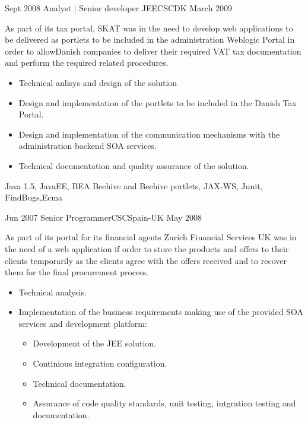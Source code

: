 \begin{experiences}
  \emptySeparator

  \experience
    {Sept 2008}     {Analyst | Senior developer JEE}{CSC}{DK}
    {March 2009}    {
    
As part of its tax portal, SKAT was in the need to develop web applications to be delivered as
portlets to be included in the administration Weblogic Portal in order to allowDanish
companies to deliver their required VAT tax documentation and perform the required related
procedures.    
    
                      \begin{itemize}
                        \item Technical anlisys and design of the solution	
                        \item Design and implementation of the portlets to be included in the Danish Tax Portal.	                
                        \item Design and implementation of the communication mechanisms with the administration backend SOA services.
                        \item Technical documentation and quality assurance of the solution.
                      \end{itemize}
                    }
                    {Java 1.5, JavaEE, BEA Beehive and Beehive portlets, JAX-WS, Junit, FindBugs,Ecma}
  
  
  
  \emptySeparator
  
  
  
  \experience
  {Jun 2007}       {Senior Programmer}{CSC}{Spain-UK}
  {May 2008}   {
  
  As part of its portal for its financial agents Zurich Financial Services UK was in the need of a web application if order to store the products and offers to their clients temporarily as the clients agree with the offers received and to recover them for the final procurement process.
  
                      \begin{itemize}
                        
                        \item Technical analysis. 

                        \item Implementation of the business requirements making use of the provided SOA services and development platform:
                        \begin{itemize}
                          \item Development of the JEE solution.
                          \item Continious integration configuration.
                          \item Technical documentation.
                          \item Assurance of code quality standards, unit testing, intgration testing and documentation. 
                        \end{itemize}


\end{itemize}}
\end{experiences}
